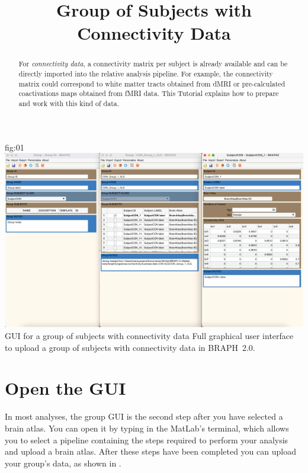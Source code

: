 \documentclass[justified]{tufte-handout}
\title{Group of Subjects with Connectivity Data}
\begin{document}
\maketitle

\begin{abstract}
\noindent
For \emph{connectivity data}, a connectivity matrix per subject is already available and can be directly imported into the relative analysis pipeline. For example, the connectivity matrix could correspond to white matter tracts obtained from dMRI or pre-calculated coactivations maps obtained from fMRI data.
This Tutorial explains how to prepare and work with this kind of data.
\end{abstract}

\tableofcontents

	{fig:01}
	{\includegraphics{fig01}}
	{GUI for a group of subjects with connectivity data}
	{
	Full graphical user interface to upload a group of subjects with connectivity data in BRAPH~2.0. 
	}

\clearpage
\section{Open the GUI}

In most analyses, the group GUI is the second step after you have selected a brain atlas. You can open it by typing  in the MatLab's terminal, which allows you to select a pipeline containing the steps required to perform your analysis and upload a brain atlas. After these steps have been completed you can upload your group's data, as shown in .
\end{document}
